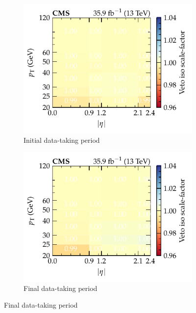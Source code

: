 \begin{figure}[htbp]
    \centering
    \begin{subfigure}[b]{0.49\textwidth}
        \centering
        \includegraphics{chapters/041_corrections/images/efficiencies/objects/muons/muon_iso_loose_runbf.pdf}
        \caption{Initial data-taking period}
        \label{subfiga:muon-iso-scale-factors}
    \end{subfigure}
    \hfill
    \begin{subfigure}[b]{0.49\textwidth}
        \centering
        \includegraphics{chapters/041_corrections/images/efficiencies/objects/muons/muon_iso_loose_rungh.pdf}
        \caption{Final data-taking period}
        \label{subfigb:muon-iso-scale-factors}
    \end{subfigure}

\end{figure}
